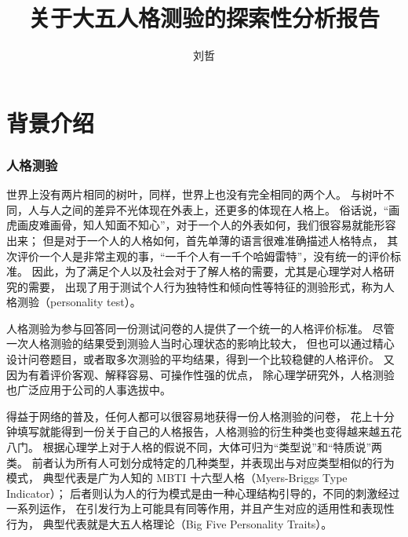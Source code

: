 \documentclass[UTF8]{ctexart}
\begin{document}
  \title{关于大五人格测验的探索性分析报告}
  \author{刘哲}
  \maketitle
  \part{背景介绍}
    \section{人格测验}
      世界上没有两片相同的树叶，同样，世界上也没有完全相同的两个人。
      与树叶不同，人与人之间的差异不光体现在外表上，还更多的体现在人格上。
      俗话说，“画虎画皮难画骨，知人知面不知心”，对于一个人的外表如何，我们很容易就能形容出来；
      但是对于一个人的人格如何，首先单薄的语言很难准确描述人格特点，
      其次评价一个人是非常主观的事，“一千个人有一千个哈姆雷特”，没有统一的评价标准。
      因此，为了满足个人以及社会对于了解人格的需要，尤其是心理学对人格研究的需要，
      出现了用于测试个人行为独特性和倾向性等特征的测验形式，称为人格测验（personality test）。\par
      人格测验为参与回答同一份测试问卷的人提供了一个统一的人格评价标准。
      尽管一次人格测验的结果受到测验人当时心理状态的影响比较大，
      但也可以通过精心设计问卷题目，或者取多次测验的平均结果，得到一个比较稳健的人格评价。
      又因为有着评价客观、解释容易、可操作性强的优点，
      除心理学研究外，人格测验也广泛应用于公司的人事选拔中。\par
      得益于网络的普及，任何人都可以很容易地获得一份人格测验的问卷，
      花上十分钟填写就能得到一份关于自己的人格报告，人格测验的衍生种类也变得越来越五花八门。
      根据心理学上对于人格的假说不同，大体可归为“类型说”和“特质说”两类。
      前者认为所有人可划分成特定的几种类型，并表现出与对应类型相似的行为模式，
      典型代表是广为人知的 MBTI 十六型人格（Myers-Briggs Type Indicator）；
      后者则认为人的行为模式是由一种心理结构引导的，不同的刺激经过一系列运作，
      在引发行为上可能具有同等作用，并且产生对应的适用性和表现性行为，
      典型代表就是大五人格理论（Big Five Personality Traits）。
\end{document}
